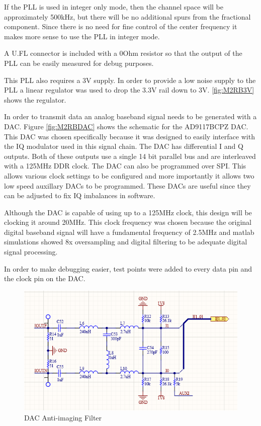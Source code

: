 \documentclass[crop=false]{standalone}
\begin{document}
        If the PLL is used in integer only mode, then the channel space will be approximately 500kHz, but there will be no additional spurs from the fractional component. Since there is no need for fine control of the center frequency it makes more sense to use the PLL in integer mode.
        
        A U.FL connector is included with a 0Ohm resistor so that the output of the PLL can be easily measured for debug purposes.
        
        This PLL also requires a 3V supply. In order to provide a low noise supply to the PLL a linear regulator was used to drop the 3.3V rail down to 3V. \ref{fig:M2RB3V} shows the regulator.
            
        \smallskip\smallskip\smallskip\smallskip\smallskip\smallskip\smallskip\smallskip
            
        In order to transmit data an analog baseband signal needs to be generated with a DAC. Figure \ref{fig:M2RBDAC} shows the schematic for the AD9117BCPZ DAC. This DAC was chosen specifically because it was designed to easily interface with the IQ modulator used in this signal chain. The DAC has differential I and Q outputs. Both of these outputs use a single 14 bit parallel bus and are interleaved with a 125MHz DDR clock. The DAC can also be programmed over SPI. This allows various clock settings to be configured and more importantly it allows two low speed auxillary DACs to be programmed. These DACs are useful since they can be adjusted to fix IQ imbalances in software.
        
        Although the DAC is capable of using up to a 125MHz clock, this design will be clocking it around 20MHz. This clock frequency was chosen because the original digital baseband signal will have a fundamental frequency of 2.5MHz and matlab simulations showed 8x oversampling and digital filtering to be adequate digital signal processing.
        
        In order to make debugging easier, test points were added to every data pin and the clock pin on the DAC.
        
        \pagebreak
        
        \begin{figure}[H]
            \centering
            \includegraphics[width=\textwidth]{M2RBDACFilter.PNG}
            \caption{DAC Anti-imaging Filter}
            \label{fig:M2RBDACFilter}
        \end{figure}
        
\end{document}
